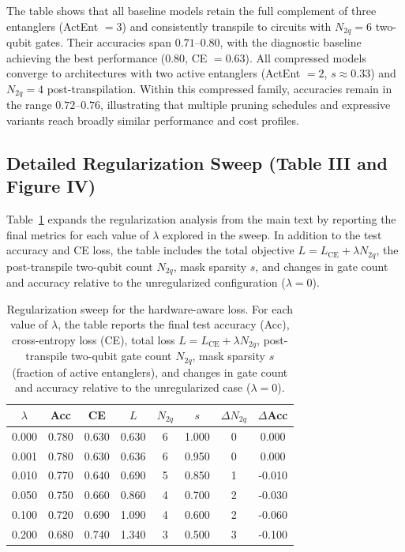 \documentclass[conference]{IEEEtran}
\begin{document}
The table shows that all baseline models retain the full complement of three
entanglers (ActEnt $=3$) and consistently transpile to circuits with $N_{2q}=6$
two-qubit gates. Their accuracies span $0.71$--$0.80$, with the diagnostic
baseline achieving the best performance (0.80, CE $=0.63$). All compressed
models converge to architectures with two active entanglers (ActEnt $=2$,
$s\approx 0.33$) and $N_{2q}=4$ post-transpilation. Within this compressed
family, accuracies remain in the range $0.72$--$0.76$, illustrating that
multiple pruning schedules and expressive variants reach broadly similar
performance and cost profiles.

\subsection{Detailed Regularization Sweep (Table III and Figure IV)}

Table~\ref{tab:lambda-sweep} expands the regularization analysis from the main
text by reporting the final metrics for each value of $\lambda$ explored in the
sweep. In addition to the test accuracy and CE loss, the table includes the
total objective $L = L_{\mathrm{CE}} + \lambda N_{2q}$, the post-transpile
two-qubit count $N_{2q}$, mask sparsity $s$, and changes in gate count and
accuracy relative to the unregularized configuration ($\lambda=0$).

\begin{table}[H]
\centering
\caption{Regularization sweep for the hardware-aware loss. 
For each value of $\lambda$, the table reports the final test accuracy (Acc), cross-entropy loss (CE), total loss $L = L_{\mathrm{CE}} + \lambda N_{2q}$, post-transpile two-qubit gate count $N_{2q}$, mask sparsity $s$ (fraction of active entanglers), and changes in gate count and accuracy relative to the unregularized case ($\lambda = 0$).}
\label{tab:lambda-sweep}
\begin{tabular}{cccccccc}
\toprule
 $\lambda$ &   Acc &    CE &   $L$ &  $N_{2q}$ &   $s$ &  $\Delta N_{2q}$ &  $\Delta$Acc \\
\midrule
     0.000 & 0.780 & 0.630 & 0.630 &         6 & 1.000 &                0 &        0.000 \\
     0.001 & 0.780 & 0.630 & 0.636 &         6 & 0.950 &                0 &        0.000 \\
     0.010 & 0.770 & 0.640 & 0.690 &         5 & 0.850 &                1 &       -0.010 \\
     0.050 & 0.750 & 0.660 & 0.860 &         4 & 0.700 &                2 &       -0.030 \\
     0.100 & 0.720 & 0.690 & 1.090 &         4 & 0.600 &                2 &       -0.060 \\
     0.200 & 0.680 & 0.740 & 1.340 &         3 & 0.500 &                3 &       -0.100 \\
\bottomrule
\end{tabular}
\end{table}
\end{document}
